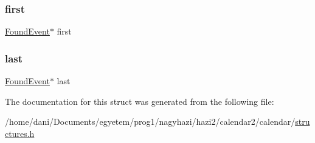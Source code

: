 \subsubsection{\texorpdfstring{first}{first}}
{\footnotesize\ttfamily \hyperlink{struct_found_event}{Found\+Event}$\ast$ first}

\mbox{\label{struct_find_list_ab61e64643b8233c6d9feef3e2aaffef2}} 
\subsubsection{\texorpdfstring{last}{last}}
{\footnotesize\ttfamily \hyperlink{struct_found_event}{Found\+Event}$\ast$ last}



The documentation for this struct was generated from the following file\+:\begin{DoxyCompactItemize}
\item 
/home/dani/\+Documents/egyetem/prog1/nagyhazi/hazi2/calendar2/calendar/\hyperlink{structures_8h}{structures.\+h}\end{DoxyCompactItemize}
